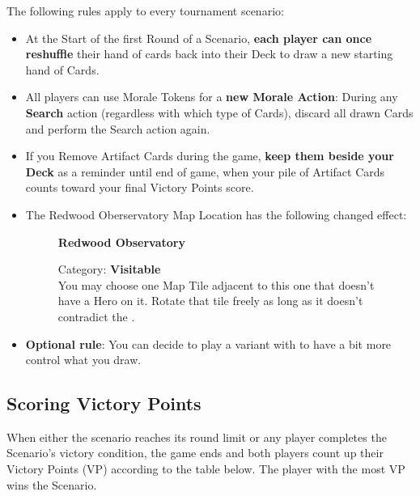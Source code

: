 \begin{multicols*}{2}
The following rules apply to every tournament scenario:
\begin{itemize}
    \item At the Start of the first Round of a Scenario, \textbf{each player can once reshuffle} their hand of cards back into their Deck to draw a new starting hand of Cards.
    \item All players can use Morale Tokens for a \textbf{new Morale Action}: During any \textbf{Search} action (regardless with which type of Cards), discard all drawn Cards and perform the Search action again.
    \item If you Remove Artifact Cards during the game, \textbf{keep them beside your Deck} as a reminder until end of game, when your pile of Artifact Cards counts toward your final Victory Points score.
    \item The Redwood Oberservatory Map Location has the following changed effect:
    \begin{figure}[H]
        \begin{minipage}[t]{0.47\textwidth}
            \vspace{0pt}
            \begin{center}
            \textbf{Redwood Observatory}\par
            \end{center}
            \small Category: \textbf{Visitable}\\You may choose one Map Tile adjacent to this one that doesn't have a Hero on it. Rotate that tile freely as long as it doesn't contradict the .
        \end{minipage}
    \end{figure}
    \item \textbf{Optional rule}: You can decide to play a variant with  to have a bit more control what you draw.
\end{itemize}

\subsection*{Scoring Victory Points}
When either the scenario reaches its round limit or any player completes the Scenario's victory condition, the game ends and both players count up their Victory Points (VP) according to the table below.
The player with the most VP wins the Scenario.


\end{multicols*}
